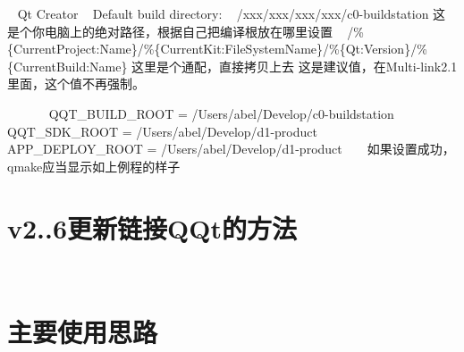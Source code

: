  ~\newline
Qt Creator ~\newline
Default build directory\+: ~\newline
/xxx/xxx/xxx/xxx/c0-\/buildstation 这是个你电脑上的绝对路径，根据自己把编译根放在哪里设置 ~\newline
/\%\{Current\+Project\+:Name\}/\%\{Current\+Kit\+:File\+System\+Name\}/\%\{Qt\+:Version\}/\%\{Current\+Build\+:Name\} 这里是个通配，直接拷贝上去 这是建议值，在\+Multi-\/link2.1里面，这个值不再强制。

 ~\newline
 ~\newline
 ~\newline
 ~\newline
Q\+Q\+T\+\_\+\+B\+U\+I\+L\+D\+\_\+\+R\+O\+OT = /\+Users/abel/\+Develop/c0-\/buildstation ~\newline
Q\+Q\+T\+\_\+\+S\+D\+K\+\_\+\+R\+O\+OT = /\+Users/abel/\+Develop/d1-\/product ~\newline
A\+P\+P\+\_\+\+D\+E\+P\+L\+O\+Y\+\_\+\+R\+O\+OT = /\+Users/abel/\+Develop/d1-\/product ~\newline
  ~\newline
如果设置成功，qmake应当显示如上例程的样子 ~\newline
 \section*{v2..\+6更新链接\+Q\+Qt的方法}

 ~\newline
 ~\newline
 \section*{主要使用思路}


